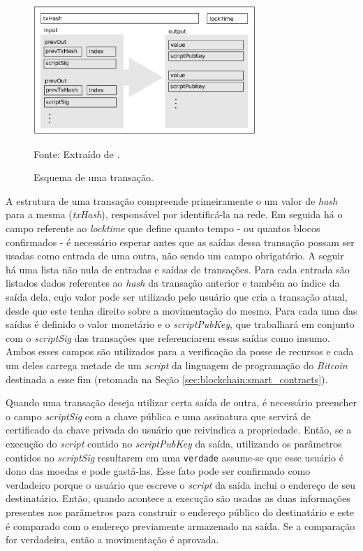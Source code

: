 \begin{figure}[ht]
\caption{Esquema de uma transação.}
\centering
\includegraphics[width=0.75\textwidth]{imagens/esquema_transacao.png}
\begin{center}
        Fonte: Extraído de \cite{blockchain:survey_bitcoin}.
\end{center}
\label{fig:blockchain:transacao}
\end{figure}

A estrutura de uma transação compreende primeiramente o um valor de \textit{hash} para a mesma (\textit{txHash}), responsável por identificá-la na rede. Em seguida há o campo referente ao \textit{locktime} que define quanto tempo - ou quantos blocos confirmados - é necessário esperar antes que as saídas dessa transação possam ser usadas como entrada de uma outra, não sendo um campo obrigatório. A seguir há uma lista não nula de entradas e saídas de transações. Para cada entrada são listados dados referentes ao \textit{hash} da transação anterior e também ao índice da saída dela, cujo valor pode ser utilizado pelo usuário que cria a transação atual, desde que este tenha direito sobre a movimentação do mesmo. Para cada uma das saídas é definido o valor monetário e o \textit{scriptPubKey}, que trabalhará em conjunto com o \textit{scriptSig} das transações que referenciarem essas saídas como insumo. Ambos esses campos são utilizados para a verificação da posse de recursos e cada um deles carrega metade de um \textit{script} da linguagem de programação do \textit{Bitcoin} destinada a esse fim (retomada na Seção \ref{sec:blockchain:smart_contracts}).

%
%
%
%
Quando uma transação deseja utilizar certa saída de outra, é necessário preencher o campo \textit{scriptSig} com a chave pública e uma assinatura que servirá de certificado da chave privada do usuário que reivindica a propriedade. Então, se a execução do \textit{script} contido no \textit{scriptPubKey} da saída, utilizando os parâmetros contidos no \textit{scriptSig} resultarem em uma \texttt{verdade} assume-se que esse usuário é dono das moedas e pode gastá-las. Esse fato pode ser confirmado como verdadeiro porque o usuário que escreve o \textit{script} da saída inclui o endereço de seu destinatário. Então, quando acontece a execução são usadas as duas informações presentes nos parâmetros para construir o endereço público do destinatário e este é comparado com o endereço previamente armazenado na saída. Se a comparação for verdadeira, então a movimentação é aprovada.

